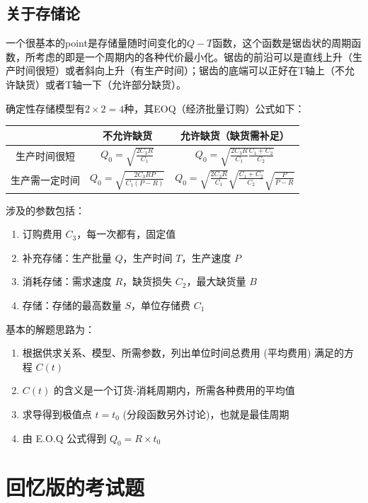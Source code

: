 \documentclass[]{report}
\begin{document}
	\section{关于存储论}
		一个很基本的point是存储量随时间变化的$Q-T$函数，这个函数是锯齿状的周期函数，所考虑的即是一个周期内的各种代价最小化。锯齿的前沿可以是直线上升（生产时间很短）或者斜向上升（有生产时间）；锯齿的底端可以正好在T轴上（不允许缺货）或者T轴一下（允许部分缺货）。\par
		确定性存储模型有$2\times2=4$种，其EOQ（经济批量订购）公式如下：\par
		\begin{table}[ht!]
			\centering
			\begin{tabular}{c|cc}
				\toprule
				&不允许缺货&允许缺货（缺货需补足）\\
				\midrule
				生产时间很短&$\displaystyle Q_0=\sqrt{\frac{2C_3R}{C_1}}$&$\displaystyle Q_0=\sqrt{\frac{2C_3R}{C_1}\frac{C_1+C_2}{C_2}}$\\
				生产需一定时间&$\displaystyle Q_0=\sqrt{\frac{2C_3RP}{C_1(P-R)}}$&$\displaystyle Q_0=\sqrt{\frac{2C_3R}{C_1}}\sqrt{\frac{C_1+C_2}{C_2}}\sqrt{\frac{P}{P-R}}$\\
				\bottomrule
			\end{tabular}
		\end{table}
		涉及的参数包括：
		\begin{enumerate}
			\item 订购费用 $C_3$，每一次都有，固定值
			\item 补充存储：生产批量 $Q$，生产时间 $T$，生产速度 $P$
			\item 消耗存储：需求速度 $R$，缺货损失 $C_2$，最大缺货量 $B$
			\item 存储：存储的最高数量 $S$，单位存储费 $C_1$
		\end{enumerate}\par
		基本的解题思路为：
		\begin{enumerate}
			\item 根据供求关系、模型、所需参数，列出单位时间总费用 (平均费用) 满足的方程 $C(t)$
			\item $C(t)$ 的含义是一个订货-消耗周期内，所需各种费用的平均值
			\item 求导得到极值点 $t=t_0$ (分段函数另外讨论)，也就是最佳周期
			\item 由 E.O.Q 公式得到 $Q_0=R\times t_0$
		\end{enumerate}\par

	\chapter{回忆版的考试题}
\end{document}
